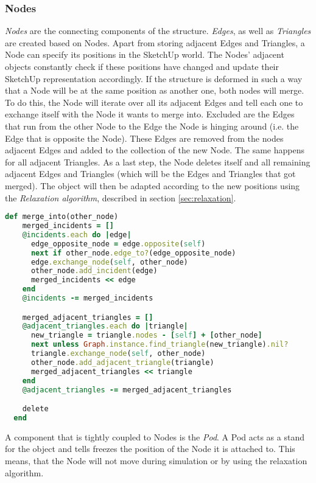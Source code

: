 \subsubsection{Nodes}
\textit{Nodes} are the connecting components of the structure. \textit{Edges}, as well as \textit{Triangles} are created based on Nodes. Apart from storing adjacent Edges and Triangles, a Node can specify its positions in the SketchUp world. The Nodes' adjacent objects constantly check if these positions have changed and update their SketchUp representation accordingly. If the structure is deformed in such a way that a Node will be at the same position as another one, both nodes will merge. To do this, the Node will iterate over all its adjacent Edges and tell each one to exchange itself with the Node it wants to merge into. Excluded are the Edges that run from the other Node to the Edge the Node is hinging around (i.e. the Edge that is opposite the Node). These Edges are removed from the nodes adjacent Edges and added to the collection of the new Node. The same happens for all adjacent Triangles. As a last step, the Node deletes itself and all remaining adjacent Edges and Triangles (which will be the Edges and Triangles that got merged). The object will then be adapted according to the new positions using the \textit{Relaxation algorithm}, described in section \ref{sec:relaxation}.
\begin{lstlisting}[language=Ruby, label={lst:merging_code}, caption=Merging of two Nodes]
  def merge_into(other_node)
    merged_incidents = []
    @incidents.each do |edge|
      edge_opposite_node = edge.opposite(self)
      next if other_node.edge_to?(edge_opposite_node)
      edge.exchange_node(self, other_node)
      other_node.add_incident(edge)
      merged_incidents << edge
    end
    @incidents -= merged_incidents

    merged_adjacent_triangles = []
    @adjacent_triangles.each do |triangle|
      new_triangle = triangle.nodes - [self] + [other_node]
      next unless Graph.instance.find_triangle(new_triangle).nil?
      triangle.exchange_node(self, other_node)
      other_node.add_adjacent_triangle(triangle)
      merged_adjacent_triangles << triangle
    end
    @adjacent_triangles -= merged_adjacent_triangles

    delete
  end
\end{lstlisting}
A component that is tightly coupled to Nodes is the \textit{Pod}. A Pod acts as a stand for the object and tells freezes the position of the Node it is attached to. This means, that the Node will not move during simulation or by using the relaxation algorithm.\\
